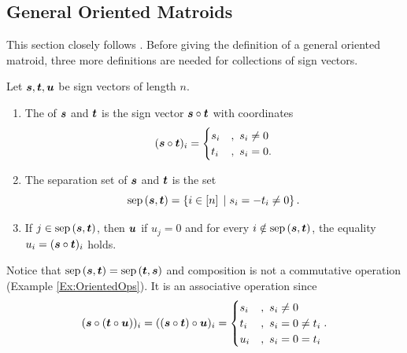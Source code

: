     \subsection{General Oriented Matroids}
        This section closely follows \cite[section 7.4]{ZieglerBook}.
        Before giving the definition of a general oriented matroid, three more definitions are needed for collections of sign vectors.
        \begin{Definition}  Let \(\bm{s},\bm{t},\bm{u}\) be sign vectors of length \(n\).
            \begin{enumerate}
                \item   The  of  \(\bm{s}\) and \(\bm{t}\) is the sign vector \(\bm{s}\circ\bm{t}\) with coordinates
                        \begin{align*}
                            (\bm{s}\circ\bm{t})_i
                                =   \begin{cases}
                                        s_i     &   ,\text{ }s_i\ne0\\
                                        t_i     &   ,\text{ }s_i=0.
                                    \end{cases}
                        \end{align*}
                \item   The separation set of \(\bm{s}\) and \(\bm{t}\) is the set
                        \[
                            \sep{\ve s}{\ve t}
                                =   \setb{i\in\brac n}{s_i=-t_i\ne0}.
                        \]
                \item   If \(j\in\operatorname{sep}\left(\bm{s},\bm{t}\right)\), then \(\bm{u}\)  if \(u_j=0\) and for every \(i\notin\operatorname{sep}\left(\bm{s},\bm{t}\right)\), the equality \(u_i=(\bm{s}\circ\bm{t})_i\) holds.
            \end{enumerate}
        \end{Definition}

        Notice that \(\operatorname{sep}\left(\bm{s},\bm{t}\right)=\operatorname{sep}\left(\bm{t},\bm{s}\right)\) and composition is not a commutative operation (Example \ref{Ex:OrientedOps}).  It is an associative operation since
            \begin{align*}
                (\bm{s}\circ(\bm{t}\circ\bm{u}))_i
                    =   ((\bm{s}\circ\bm{t})\circ\bm{u})_i
                    =   \begin{cases}
                            s_i     &,\text{ }s_i\ne0\\
                            t_i     &,\text{ }s_i=0\ne t_i\\
                            u_i     &,\text{ }s_i=0=t_i
                        \end{cases}.
            \end{align*}

